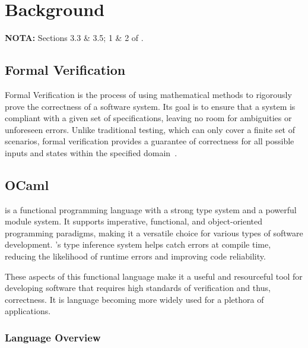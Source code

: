 
%

\chapter{Background}
\label{cha:background}

\textbf{NOTA:} Sections 3.3 \& 3.5; 1 \& 2 of \cite{Brain2025}.

\section{Formal Verification}
\label{sec:formal_verification}

Formal Verification is the process of using mathematical methods to rigorously 
prove the correctness of a software system. Its goal is to ensure that a system 
is compliant with a given set of specifications, leaving no room for ambiguities or 
unforeseen errors. Unlike traditional testing, which can only cover a 
finite set of scenarios, formal verification provides a guarantee of 
correctness for all possible inputs and states within the specified domain~\cite{Brain2025}.

\section{OCaml}
\label{sec:ocaml}

\ocaml is a functional programming language with a strong type system and a powerful
module system. It supports imperative, functional, and object-oriented programming 
paradigms, making it a versatile choice for various types of software development. 
\ocaml's type inference system helps catch errors at compile time, reducing the 
likelihood of runtime errors and improving code reliability.

These aspects of this functional language make it a useful and resourceful tool 
for developing software that requires high standards of verification and thus, correctness.
It is language becoming more widely used for a plethora of applications.

\subsection{Language Overview} %
\label{sub:language_overview}

